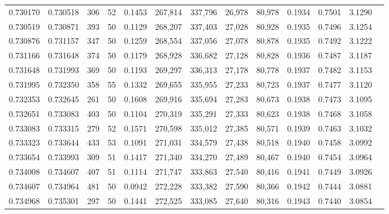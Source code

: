 \begin{tabular}{rrrrrrrrrrrrr}
0.730170 & 0.730518 &   306 &  52 &                                     0.1453 & 267,814 & 337,796 &  26,978 &  80,978 & 0.1934 & 0.7501 & 3.1290 \\
0.730519 & 0.730871 &   393 &  50 &                                     0.1129 & 268,207 & 337,403 &  27,028 &  80,928 & 0.1935 & 0.7496 & 3.1254 \\
0.730876 & 0.731157 &   347 &  50 &                                     0.1259 & 268,554 & 337,056 &  27,078 &  80,878 & 0.1935 & 0.7492 & 3.1222 \\
0.731166 & 0.731648 &   374 &  50 &                                     0.1179 & 268,928 & 336,682 &  27,128 &  80,828 & 0.1936 & 0.7487 & 3.1187 \\
0.731648 & 0.731993 &   369 &  50 &                                     0.1193 & 269,297 & 336,313 &  27,178 &  80,778 & 0.1937 & 0.7482 & 3.1153 \\
0.731995 & 0.732350 &   358 &  55 &                                     0.1332 & 269,655 & 335,955 &  27,233 &  80,723 & 0.1937 & 0.7477 & 3.1120 \\
0.732353 & 0.732645 &   261 &  50 &                                     0.1608 & 269,916 & 335,694 &  27,283 &  80,673 & 0.1938 & 0.7473 & 3.1095 \\
0.732651 & 0.733083 &   403 &  50 &                                     0.1104 & 270,319 & 335,291 &  27,333 &  80,623 & 0.1938 & 0.7468 & 3.1058 \\
0.733083 & 0.733315 &   279 &  52 &                                     0.1571 & 270,598 & 335,012 &  27,385 &  80,571 & 0.1939 & 0.7463 & 3.1032 \\
0.733323 & 0.733644 &   433 &  53 &                                     0.1091 & 271,031 & 334,579 &  27,438 &  80,518 & 0.1940 & 0.7458 & 3.0992 \\
0.733654 & 0.733993 &   309 &  51 &                                     0.1417 & 271,340 & 334,270 &  27,489 &  80,467 & 0.1940 & 0.7454 & 3.0964 \\
0.734008 & 0.734607 &   407 &  51 &                                     0.1114 & 271,747 & 333,863 &  27,540 &  80,416 & 0.1941 & 0.7449 & 3.0926 \\
0.734607 & 0.734964 &   481 &  50 &                                     0.0942 & 272,228 & 333,382 &  27,590 &  80,366 & 0.1942 & 0.7444 & 3.0881 \\
0.734968 & 0.735301 &   297 &  50 &                                     0.1441 & 272,525 & 333,085 &  27,640 &  80,316 & 0.1943 & 0.7440 & 3.0854 \\

\end{tabular}
